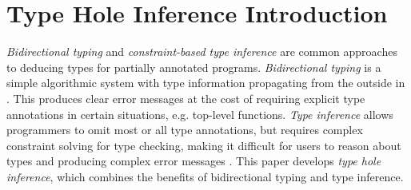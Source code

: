



\section{Type Hole Inference Introduction}
\label{sec:intro}
\emph{Bidirectional typing} and \emph{constraint-based type inference} are common approaches to deducing types for partially annotated programs. \emph{Bidirectional typing} is a simple algorithmic system with type information propagating from the outside in \cite{BidirTyping}. This produces clear error messages at the cost of requiring explicit type annotations in certain situations, e.g. top-level functions. \emph{Type inference} allows programmers to omit most or all type annotations, but requires complex constraint solving for type checking, making it difficult for users to reason about types and producing complex error messages \cite{typeinferDif}.
This paper develops \emph{type hole inference}, which combines the benefits of bidirectional typing and type inference.\par

